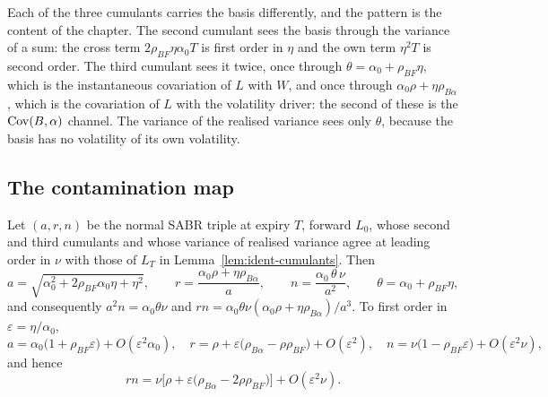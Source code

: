 \documentclass[../../../main.tex]{subfiles}
\begin{document}
Each of the three cumulants carries the basis differently, and the pattern is the content of the chapter. The second cumulant sees the basis through the variance of a sum: the cross term $2\rho_{BF}\eta\alpha_0T$ is first order in $\eta$ and the own term $\eta^2T$ is second order. The third cumulant sees it twice, once through $\theta=\alpha_0+\rho_{BF}\eta$, which is the instantaneous covariation of $L$ with $W$, and once through $\alpha_0\rho+\eta\rho_{B\alpha}$, which is the covariation of $L$ with the volatility driver: the second of these is the $\operatorname{Cov}(B,\alpha)$ channel. The variance of the realised variance sees only $\theta$, because the basis has no volatility of its own volatility.

\subsection{The contamination map}

\begin{proposition}\label{prop:ident-map}
Let $(a,r,n)$ be the normal SABR triple at expiry $T$, forward $L_0$, whose second and third cumulants and whose variance of realised variance agree at leading order in $\nu$ with those of $L_T$ in Lemma~\ref{lem:ident-cumulants}. Then
\begin{equation}\label{eq:ident-map}
a=\sqrt{\alpha_0^2+2\rho_{BF}\alpha_0\eta+\eta^2},\qquad
r=\frac{\alpha_0\rho+\eta\rho_{B\alpha}}{a},\qquad
n=\frac{\alpha_0\,\theta\,\nu}{a^2},\qquad \theta=\alpha_0+\rho_{BF}\eta,
\end{equation}
and consequently $a^2n=\alpha_0\theta\nu$ and $rn=\alpha_0\theta\nu(\alpha_0\rho+\eta\rho_{B\alpha})/a^3$. To first order in $\varepsilon=\eta/\alpha_0$,
\begin{equation}\label{eq:ident-map1}
a=\alpha_0\big(1+\rho_{BF}\varepsilon\big)+O(\varepsilon^2\alpha_0),\quad
r=\rho+\varepsilon\big(\rho_{B\alpha}-\rho\rho_{BF}\big)+O(\varepsilon^2),\quad
n=\nu\big(1-\rho_{BF}\varepsilon\big)+O(\varepsilon^2\nu),
\end{equation}
and hence
\begin{equation}\label{eq:ident-rn1}
rn=\nu\Big[\rho+\varepsilon\big(\rho_{B\alpha}-2\rho\rho_{BF}\big)\Big]+O(\varepsilon^2\nu).
\end{equation}
\end{proposition}
\end{document}
